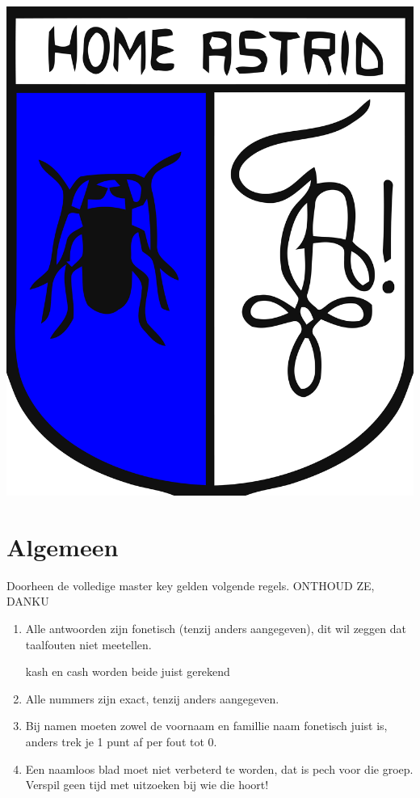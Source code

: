 \documentclass{exam}
\begin{document}
\thispagestyle{empty}
\begin{titlepage}
\center
\includegraphics[scale=0.08]{astrid}
\linebreak
\linebreak
\linebreak

\vspace{1em}{\huge \bfseries  De Astrid Quiz Master Key }
\linebreak

\vspace{1em}{\LARGE  Door cultuur home Astrid} 
            \linebreak
\vspace{1em}{\large Geen toestemming tot herverdeling}
\end{titlepage}
\newpage
\section*{Algemeen}
Doorheen de volledige master key gelden volgende regels.
\large{ONTHOUD ZE, DANKU }
\begin{enumerate}
\item{Alle antwoorden zijn fonetisch (tenzij anders aangegeven), dit wil zeggen dat taalfouten niet meetellen.\par kash en cash worden beide juist gerekend}
\item{Alle nummers zijn exact, tenzij anders aangegeven.}
\item{Bij namen moeten zowel de voornaam en famillie naam fonetisch juist is, anders trek je 1 punt af per fout tot 0. }
\item{Een naamloos blad moet niet verbeterd te worden, dat is pech voor die groep. Verspil geen tijd met uitzoeken bij wie die hoort!}
\end{enumerate}
\end{document}
